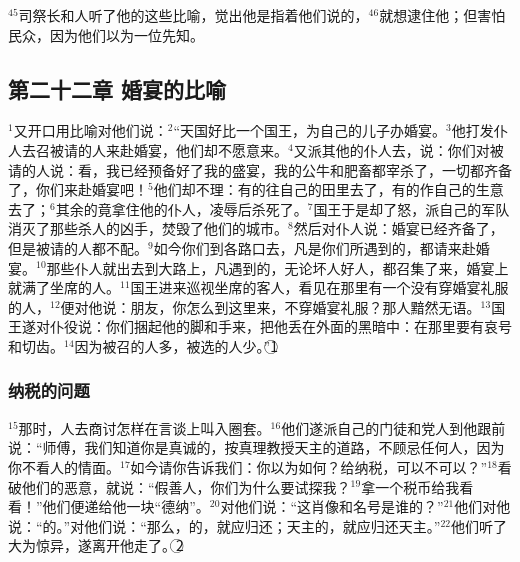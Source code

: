 $^{45}$司祭长和\UL[法利塞]人听了他的这些比喻，觉出他是指着他们说的，$^{46}$就想逮住他；但害怕民众，因为他们以\UL[耶稣]为一位先知。


\subsection{第二十二章 婚宴的比喻}
$^{1}$\UL[耶稣]又开口用比喻对他们说：$^{2}$“天国好比一个国王，为自己的儿子办婚宴。$^{3}$他打发仆人去召被请的人来赴婚宴，他们却不愿意来。$^{4}$又派其他的仆人去，说：你们对被请的人说：看，我已经预备好了我的盛宴，我的公牛和肥畜都宰杀了，一切都齐备了，你们来赴婚宴吧！$^{5}$他们却不理：有的往自己的田里去了，有的作自己的生意去了；$^{6}$其余的竟拿住他的仆人，凌辱后杀死了。$^{7}$国王于是却了怒，派自己的军队消灭了那些杀人的凶手，焚毁了他们的城市。$^{8}$然后对仆人说：婚宴已经齐备了，但是被请的人都不配。$^{9}$如今你们到各路口去，凡是你们所遇到的，都请来赴婚宴。$^{10}$那些仆人就出去到大路上，凡遇到的，无论坏人好人，都召集了来，婚宴上就满了坐席的人。$^{11}$国王进来巡视坐席的客人，看见在那里有一个没有穿婚宴礼服的人，$^{12}$便对他说：朋友，你怎么到这里来，不穿婚宴礼服？那人黯然无语。$^{13}$国王遂对仆役说：你们捆起他的脚和手来，把他丢在外面的黑暗中：在那里要有哀号和切齿。$^{14}$因为被召的人多，被选的人少。”\textcircled{1}


\subsubsection{纳税的问题}
$^{15}$那时，\UL[法利塞]人去商讨怎样在言谈上叫\UL[耶稣]入圈套。$^{16}$他们遂派自己的门徒和\UL[黑落德]党人到他跟前说：“师傅，我们知道你是真诚的，按真理教授天主的道路，不顾忌任何人，因为你不看人的情面。$^{17}$如今请你告诉我们：你以为如何？给\UL[凯撒]纳税，可以不可以？”$^{18}$\UL[耶稣]看破他们的恶意，就说：“假善人，你们为什么要试探我？$^{19}$拿一个税币给我看看！”他们便递给他一块“德纳”。$^{20}$\UL[耶稣]对他们说：“这肖像和名号是谁的？”$^{21}$他们对他说：“\UL[凯撒]的。”\UL[耶稣]对他们说：“那么，\UL[凯撒]的，就应归还\UL[凯撒]；天主的，就应归还天主。”$^{22}$他们听了大为惊异，遂离开他走了。\textcircled{2}


